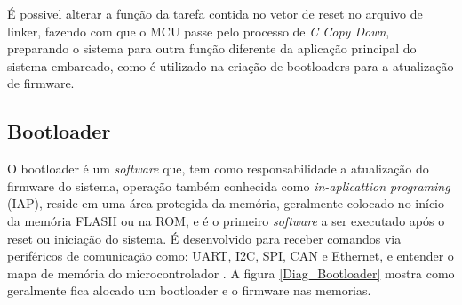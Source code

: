 É possivel alterar a função da tarefa contida no vetor de reset no arquivo de linker, fazendo com que o MCU passe pelo processo de \textit{C Copy Down}, preparando o sistema para outra função diferente da aplicação principal do sistema embarcado, como é utilizado na criação de bootloaders para a atualização de firmware.













\subsection{Bootloader}
O bootloader é um \textit{software} que, tem como responsabilidade a atualização do firmware do sistema, operação também conhecida como \textit{in-aplicattion programing} (IAP),  reside em uma área protegida da memória, geralmente colocado no início da memória FLASH ou na ROM, e é o primeiro \textit{software} a ser executado após o reset ou iniciação do sistema.
É desenvolvido para receber comandos via periféricos de comunicação como: UART, I2C, SPI, CAN e Ethernet, e entender o mapa de memória do microcontrolador \cite{DavesDurlin2013}. A figura \ref{Diag_Bootloader} mostra como geralmente fica alocado um bootloader e o firmware nas memorias.

